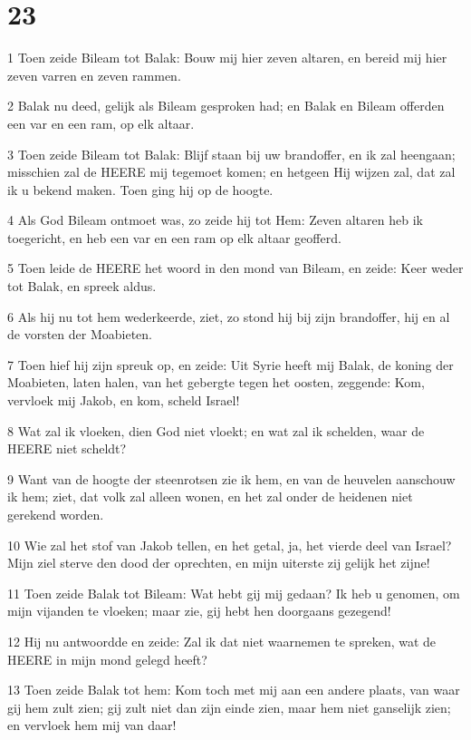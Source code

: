\chapter{23}

\par 1 Toen zeide Bileam tot Balak: Bouw mij hier zeven altaren, en bereid mij hier zeven varren en zeven rammen.
\par 2 Balak nu deed, gelijk als Bileam gesproken had; en Balak en Bileam offerden een var en een ram, op elk altaar.
\par 3 Toen zeide Bileam tot Balak: Blijf staan bij uw brandoffer, en ik zal heengaan; misschien zal de HEERE mij tegemoet komen; en hetgeen Hij wijzen zal, dat zal ik u bekend maken. Toen ging hij op de hoogte.
\par 4 Als God Bileam ontmoet was, zo zeide hij tot Hem: Zeven altaren heb ik toegericht, en heb een var en een ram op elk altaar geofferd.
\par 5 Toen leide de HEERE het woord in den mond van Bileam, en zeide: Keer weder tot Balak, en spreek aldus.
\par 6 Als hij nu tot hem wederkeerde, ziet, zo stond hij bij zijn brandoffer, hij en al de vorsten der Moabieten.
\par 7 Toen hief hij zijn spreuk op, en zeide: Uit Syrie heeft mij Balak, de koning der Moabieten, laten halen, van het gebergte tegen het oosten, zeggende: Kom, vervloek mij Jakob, en kom, scheld Israel!
\par 8 Wat zal ik vloeken, dien God niet vloekt; en wat zal ik schelden, waar de HEERE niet scheldt?
\par 9 Want van de hoogte der steenrotsen zie ik hem, en van de heuvelen aanschouw ik hem; ziet, dat volk zal alleen wonen, en het zal onder de heidenen niet gerekend worden.
\par 10 Wie zal het stof van Jakob tellen, en het getal, ja, het vierde deel van Israel? Mijn ziel sterve den dood der oprechten, en mijn uiterste zij gelijk het zijne!
\par 11 Toen zeide Balak tot Bileam: Wat hebt gij mij gedaan? Ik heb u genomen, om mijn vijanden te vloeken; maar zie, gij hebt hen doorgaans gezegend!
\par 12 Hij nu antwoordde en zeide: Zal ik dat niet waarnemen te spreken, wat de HEERE in mijn mond gelegd heeft?
\par 13 Toen zeide Balak tot hem: Kom toch met mij aan een andere plaats, van waar gij hem zult zien; gij zult niet dan zijn einde zien, maar hem niet ganselijk zien; en vervloek hem mij van daar!
